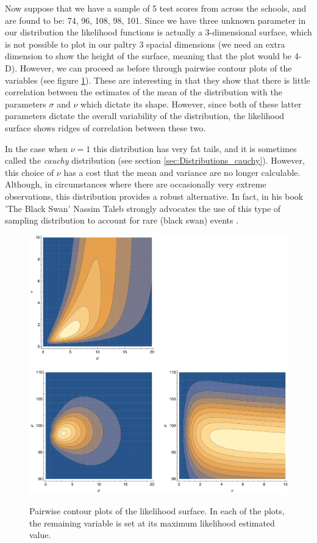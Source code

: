 \documentclass[11pt,fullpage]{book}
\begin{document}
Now suppose that we have a sample of 5 test scores from across the schools, and are found to be: {74, 96, 108, 98, 101}. Since we have three unknown parameter in our distribution the likelihood functions is actually a 3-dimensional surface, which is not possible to plot in our paltry 3 spacial dimensions (we need an extra dimension to show the height of the surface, meaning that the plot would be 4-D). However, we can proceed as before through pairwise contour plots of the variables (see figure \ref{fig:Distributions_tArithmeticLikelihood}). These are interesting in that they show that there is little correlation between the estimates of the mean of the distribution with the parameters $\sigma$ and $\nu$ which dictate its shape. However, since both of these latter parameters dictate the overall variability of the distribution, the likelihood surface shows ridges of correlation between these two.

In the case when $\nu=1$ this distribution has very fat tails, and it is sometimes called the \textit{cauchy} distribution (see section \ref{sec:Distributions_cauchy}). However, this choice of $\nu$ has a cost that the mean and variance are no longer calculable. Although, in circumstances where there are occasionally very extreme observations, this distribution provides a robust alternative. In fact, in his book 'The Black Swan' Nassim Taleb strongly advocates the use of this type of sampling distribution to account for rare (black swan) events \cite{taleb2010black}.

\begin{figure}
\centering
\scalebox{0.5} 
{\includegraphics{Distributions_tArithmeticLikelihood.pdf}}
\caption{Pairwise contour plots of the likelihood surface. In each of the plots, the remaining variable is set at its maximum likelihood estimated value.}\label{fig:Distributions_tArithmeticLikelihood}
\end{figure}
\end{document}
